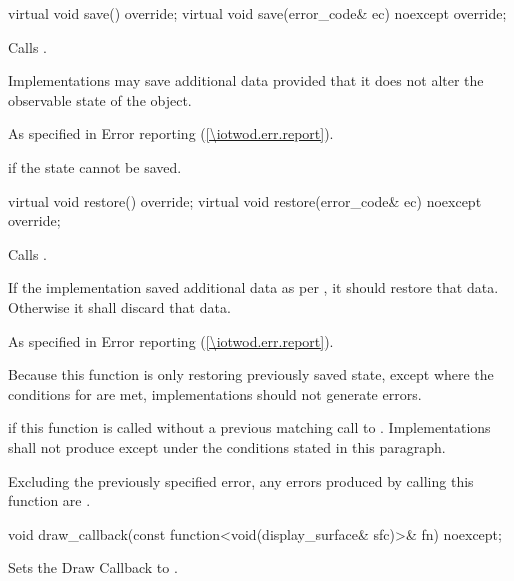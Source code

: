 \begin{itemdecl}
virtual void save() override;
virtual void save(error_code& ec) noexcept override;
\end{itemdecl}
\begin{itemdescr}
\pnum
\effects
Calls .

\pnum
Implementations may save additional data provided that it does not alter the observable state of the  object.

\pnum
\throws
As specified in Error reporting (\ref{\iotwod.err.report}).

\pnum
\errors
{} if the state cannot be saved.
\end{itemdescr}

\begin{itemdecl}
virtual void restore() override;
virtual void restore(error_code& ec) noexcept override;
\end{itemdecl}
\begin{itemdescr}
\pnum
\effects
Calls .

\pnum
If the implementation saved additional data as per , it should restore that data. Otherwise it shall discard that data.

\pnum
\throws
As specified in Error reporting (\ref{\iotwod.err.report}).

\pnum
\remarks
Because this function is only restoring previously saved state, except where the conditions for  are met, implementations should not generate errors.

\pnum
\errors
{} if this function is called without a previous matching call to . Implementations shall not produce  except under the conditions stated in this paragraph.

\pnum
Excluding the previously specified error, any errors produced by calling this function are .
\end{itemdescr}

\begin{itemdecl}
void draw_callback(const function<void(display_surface& sfc)>& fn) noexcept;
\end{itemdecl}
\begin{itemdescr}
\pnum
\effects
Sets the Draw Callback to .
\end{itemdescr}

